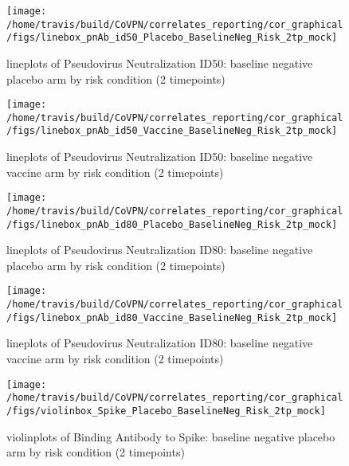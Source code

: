 \documentclass[]{book}
\theoremstyle{definition}
\theoremstyle{definition}
\theoremstyle{definition}
\newcommand{\1}{\mathbbm{1}}
\begin{document}
\clearpage
\begin{figure}[H]

{\centering \texttt{[image: /home/travis/build/CoVPN/correlates\_reporting/cor\_graphical/figs/linebox\_pnAb\_id50\_Placebo\_BaselineNeg\_Risk\_2tp\_mock]} 

}

\caption{lineplots of Pseudovirus Neutralization ID50: baseline negative placebo arm by risk condition (2 timepoints)}\label{fig:unnamed-chunk-95}
\end{figure}

\clearpage
\begin{figure}[H]

{\centering \texttt{[image: /home/travis/build/CoVPN/correlates\_reporting/cor\_graphical/figs/linebox\_pnAb\_id50\_Vaccine\_BaselineNeg\_Risk\_2tp\_mock]} 

}

\caption{lineplots of Pseudovirus Neutralization ID50: baseline negative vaccine arm by risk condition (2 timepoints)}\label{fig:unnamed-chunk-96}
\end{figure}

\clearpage
\begin{figure}[H]

{\centering \texttt{[image: /home/travis/build/CoVPN/correlates\_reporting/cor\_graphical/figs/linebox\_pnAb\_id80\_Placebo\_BaselineNeg\_Risk\_2tp\_mock]} 

}

\caption{lineplots of Pseudovirus Neutralization ID80: baseline negative placebo arm by risk condition (2 timepoints)}\label{fig:unnamed-chunk-97}
\end{figure}

\clearpage
\begin{figure}[H]

{\centering \texttt{[image: /home/travis/build/CoVPN/correlates\_reporting/cor\_graphical/figs/linebox\_pnAb\_id80\_Vaccine\_BaselineNeg\_Risk\_2tp\_mock]} 

}

\caption{lineplots of Pseudovirus Neutralization ID80: baseline negative vaccine arm by risk condition (2 timepoints)}\label{fig:unnamed-chunk-98}
\end{figure}

\clearpage
\begin{figure}[H]

{\centering \texttt{[image: /home/travis/build/CoVPN/correlates\_reporting/cor\_graphical/figs/violinbox\_Spike\_Placebo\_BaselineNeg\_Risk\_2tp\_mock]} 

}

\caption{violinplots of Binding Antibody to Spike: baseline negative placebo arm by risk condition (2 timepoints)}\label{fig:unnamed-chunk-99}
\end{figure}
\end{document}
